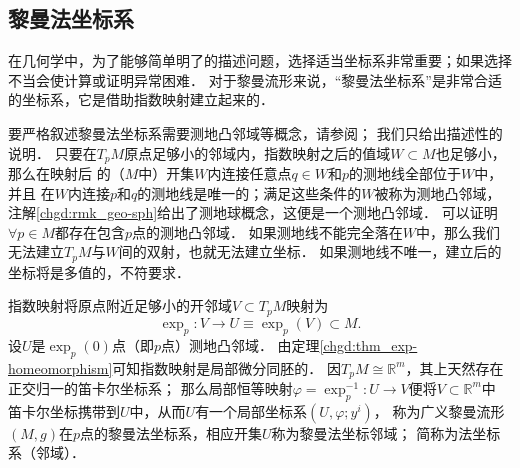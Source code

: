


\subsection{黎曼法坐标系}\label{chgd:sec_RNC}
在几何学中，为了能够简单明了的描述问题，选择适当坐标系非常重要；如果选择不当会使计算或证明异常困难．
对于黎曼流形来说，“黎曼法坐标系”是非常合适的坐标系，它是借助指数映射建立起来的．

要严格叙述黎曼法坐标系需要测地凸邻域等概念，请参阅\parencite[\S 3.4-3.5]{chen-li-2023-2ed-v1}；
我们只给出描述性的说明．
只要在$T_pM$原点足够小的邻域内，指数映射之后的值域$W\subset M$也足够小，那么在映射后
的（$M$中）开集$W$内连接任意点$q\in W$和$p$的测地线全部位于$W$中，并且
在$W$内连接$p$和$q$的测地线是唯一的；满足这些条件的$W$被称为测地凸邻域，
注解\ref{chgd:rmk_geo-sph}给出了测地球概念，这便是一个测地凸邻域．
可以证明$\forall p \in M$都存在包含$p$点的测地凸邻域．
如果测地线不能完全落在$W$中，那么我们无法建立$T_pM$与$W$间的双射，也就无法建立坐标．
如果测地线不唯一，建立后的坐标将是多值的，不符要求．



指数映射将原点附近足够小的开邻域$V\subset T_pM$映射为
\begin{equation}
    \exp_{p} : V \to U \equiv\exp_{p}(V) \subset M .
\end{equation}
设$U$是$\exp_{p}(0)$点（即$p$点）测地凸邻域．
由定理\ref{chgd:thm_exp-homeomorphism}可知指数映射是局部微分同胚的．
因$T_pM \cong \mathbb{R}^m$，其上天然存在正交归一的笛卡尔坐标系；
那么局部恒等映射$\varphi = \exp_{p}^{-1}:U\to V$便将$V\subset \mathbb{R}^m$中
笛卡尔坐标携带到$U$中，从而$U$有一个局部坐标系$(U,\varphi;y^i)$，
称为广义黎曼流形$(M,g)$在$p$点的{\heiti 黎曼法坐标系}，相应开集$U$称为{\heiti 黎曼法坐标邻域}；
简称为{\heiti 法坐标系（邻域）}．



